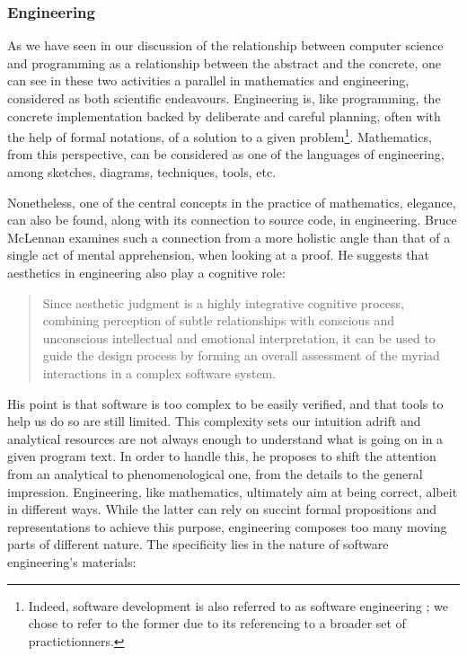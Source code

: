 \subsubsection{Engineering}
\label{subsubsec:beauty-engineering}

As we have seen in our discussion of the relationship between computer science and programming as a relationship between the abstract and the concrete, one can see in these two activities a parallel in mathematics and engineering, considered as both scientific endeavours. Engineering is, like programming, the concrete implementation backed by deliberate and careful planning, often with the help of formal notations, of a solution to a given problem\footnote{Indeed, software development is also referred to as software engineering \citep{bourque_swebok_2014}; we chose to refer to the former due to its referencing to a broader set of practictionners.}. Mathematics, from this perspective, can be considered as one of the languages of engineering, among sketches, diagrams, techniques, tools, etc.

Nonetheless, one of the central concepts in the practice of mathematics, elegance, can also be found, along with its connection to source code, in engineering. Bruce McLennan examines such a connection from a more holistic angle than that of a single act of mental apprehension, when looking at a proof. He suggests that aesthetics in engineering also play a cognitive role:

\begin{quote}
  Since aesthetic judgment is a highly integrative cognitive process, combining perception of subtle relationships with conscious and unconscious intellectual and emotional interpretation, it can be used to guide the design process by forming an overall assessment of the myriad interactions in a complex software system. \citep{schummer_aesthetic_2009}
\end{quote}

His point is that software is too complex to be easily verified, and that tools to help us do so are still limited. This complexity sets our intuition adrift and analytical resources are not always enough to understand what is going on in a given program text. In order to handle this, he proposes to shift the attention from an analytical to phenomenological one, from the details to the general impression. Engineering, like mathematics, ultimately aim at being correct, albeit in different ways. While the latter can rely on succint formal propositions and representations to achieve this purpose, engineering composes too many moving parts of different nature. The specificity lies in the nature of software engineering's materials:

